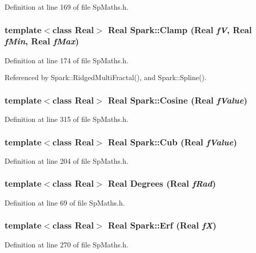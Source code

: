 Definition at line 169 of file Sp\-Maths.h.
\subsubsection{\setlength{\rightskip}{0pt plus 5cm}template$<$class Real$>$ Real Spark::Clamp (Real {\em f\-V}, Real {\em f\-Min}, Real {\em f\-Max})}\label{namespaceSpark_a42}


Definition at line 174 of file Sp\-Maths.h.

Referenced by Spark::Ridged\-Multi\-Fractal(), and Spark::Spline().
\subsubsection{\setlength{\rightskip}{0pt plus 5cm}template$<$class Real$>$ Real Spark::Cosine (Real {\em f\-Value})}\label{namespaceSpark_a65}


Definition at line 315 of file Sp\-Maths.h.
\subsubsection{\setlength{\rightskip}{0pt plus 5cm}template$<$class Real$>$ Real Spark::Cub (Real {\em f\-Value})}\label{namespaceSpark_a48}


Definition at line 204 of file Sp\-Maths.h.
\subsubsection{\setlength{\rightskip}{0pt plus 5cm}template$<$class Real$>$ Real Degrees (Real {\em f\-Rad})}\label{namespaceSpark_a39}


Definition at line 69 of file Sp\-Maths.h.
\subsubsection{\setlength{\rightskip}{0pt plus 5cm}template$<$class Real$>$ Real Spark::Erf (Real {\em f\-X})}\label{namespaceSpark_a60}


Definition at line 270 of file Sp\-Maths.h.
